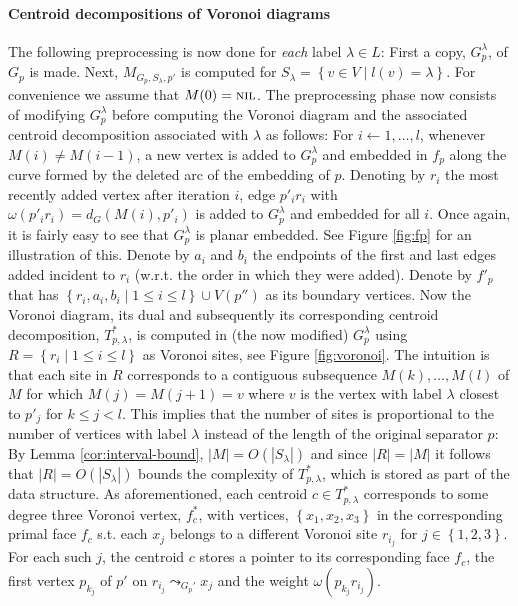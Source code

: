 \documentclass[a4paper,UKenglish,cleveref, autoref, thm-restate]{article}
\begin{document}
\paragraph*{Centroid decompositions of Voronoi diagrams} The following preprocessing is now done for \textit{each} label $\lambda \in L$: First a copy, $G^\lambda_p$, of $G_p$ is made. Next, $M_{G_p,S_\lambda, p'}$ is computed for $S_\lambda = \left\{ v \in V \; | \; l(v) = \lambda \right\}$. For convenience we assume that $M(0) = \textsc{nil}$. The preprocessing phase now consists of modifying $G^\lambda_p$ before computing the Voronoi diagram and the associated centroid decomposition associated with $\lambda$ as follows: For $i \gets 1, \hdots, l$, whenever $M(i) \neq M(i-1)$, a new vertex is added to $G^\lambda_p$ and embedded in $f_p$ along the curve formed by the deleted arc of the embedding of $p$. Denoting by $r_i$ the most recently added vertex after iteration $i$, edge $p'_ir_i$ with $\omega(p'_ir_i) = d_G(M(i),p'_i)$ is added to $G^\lambda_p$ and embedded for all $i$. Once again, it is fairly easy to see that $G^\lambda_p$ is planar embedded. See Figure \ref{fig:fp} for an illustration of this. Denote by $a_i$ and $b_i$ the endpoints of the first and last edges added incident to $r_i$ (w.r.t. the order in which they were added). Denote by $f'_p$ that has $\left\{ r_i, a_i, b_i\; | \; 1 \leq i \leq l \right\} \cup V(p'')$ as its boundary vertices. Now the Voronoi diagram, its dual and subsequently its corresponding centroid decomposition, $T^*_{p,\lambda}$, is computed in (the now modified) $G^\lambda_p$ using $R = \left\{ r_i \; | \; 1 \leq i \leq l \right\}$ as Voronoi sites, see Figure \ref{fig:voronoi}. The intuition is that each site in $R$ corresponds to a contiguous subsequence $M(k),\hdots,M(l)$ of $M$ for which $M(j)=M(j+1)=v$ where $v$ is the vertex with label $\lambda$ closest to $p'_j$ for $k \leq j < l$. This implies that the number of sites is proportional to the number of vertices with label $\lambda$ instead of the length of the original separator $p$: By Lemma \ref{cor:interval-bound}, $|M| = O(|S_\lambda|)$ and since $|R| = |M|$ it follows that $|R| = O(|S_\lambda|)$ bounds the complexity of $T^*_{p,\lambda}$, which is stored as part of the data structure. As aforementioned, each centroid $c \in T^*_{p,\lambda}$ corresponds to some degree three Voronoi vertex, $f_c^*$, with vertices, $\left\{ x_1,x_2,x_3 \right\}$ in the corresponding primal face $f_c$ s.t. each $x_j$ belongs to a different Voronoi site $r_{i_j}$ for $j \in \left\{ 1,2,3 \right\}$. For each such $j$, the centroid $c$ stores a pointer to its corresponding face $f_c$, the first vertex $p_{k_j}$ of $p'$ on $r_{i_j} \leadsto_{G_p'} x_{j}$ and the weight $\omega(p_{k_j}r_{i_j})$.
\end{document}

